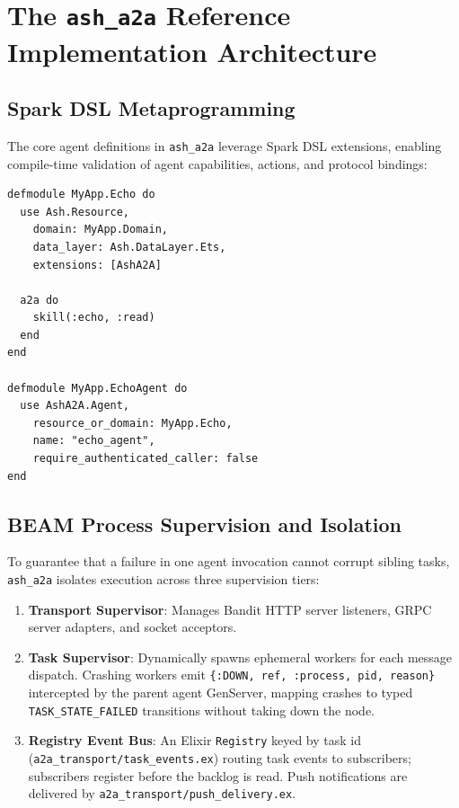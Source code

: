 \documentclass[11pt,twoside,openright]{report}
\theoremstyle{definition}
\theoremstyle{plain}
\theoremstyle{remark}
\begin{document}
\chapter{The \texttt{ash\_a2a} Reference Implementation Architecture}
\label{ch:ash_a2a}

\section{Spark DSL Metaprogramming}
The core agent definitions in \texttt{ash\_a2a} leverage Spark DSL extensions, enabling compile-time validation of agent capabilities, actions, and protocol bindings:
\begin{lstlisting}
defmodule MyApp.Echo do
  use Ash.Resource,
    domain: MyApp.Domain,
    data_layer: Ash.DataLayer.Ets,
    extensions: [AshA2A]

  a2a do
    skill(:echo, :read)
  end
end

defmodule MyApp.EchoAgent do
  use AshA2A.Agent,
    resource_or_domain: MyApp.Echo,
    name: "echo_agent",
    require_authenticated_caller: false
end
\end{lstlisting}

\section{BEAM Process Supervision and Isolation}
To guarantee that a failure in one agent invocation cannot corrupt sibling tasks, \texttt{ash\_a2a} isolates execution across three supervision tiers:
\begin{enumerate}
    \item \textbf{Transport Supervisor}: Manages Bandit HTTP server listeners, GRPC server adapters, and socket acceptors.
    \item \textbf{Task Supervisor}: Dynamically spawns ephemeral workers for each message dispatch. Crashing workers emit \texttt{\{:DOWN, ref, :process, pid, reason\}} intercepted by the parent agent GenServer, mapping crashes to typed \texttt{TASK\_STATE\_FAILED} transitions without taking down the node.
    \item \textbf{Registry Event Bus}: An Elixir \texttt{Registry} keyed by task id (\texttt{a2a\_transport/task\_events.ex}) routing task events to subscribers; subscribers register before the backlog is read. Push notifications are delivered by \texttt{a2a\_transport/push\_delivery.ex}.
\end{enumerate}
\end{document}
